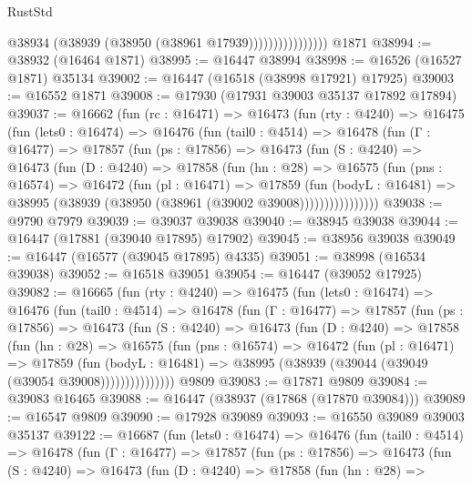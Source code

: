 \begin{lexlean}{RustStd}
\begin{coremodule}
{\begin{coremodule}
{{{{{{{{{{{{{{{{{{{{{{{{{{{{{{{{{{{{{{{{{{{{{{{{{{{{{{{                            @38934 (@38939 (@38950 (@38961 @17939))))))))))))))))
    @1871
@38994 := @38932 (@16464 @1871)
@38995 := @16447 @38994
@38998 := @16526 (@16527 @1871) @35134
@39002 := @16447 (@16518 (@38998 @17921) @17925)
@39003 := @16552 @1871
@39008 := @17930 (@17931 @39003 @35137 @17892 @17894)
@39037 := @16662
    (fun (rc : @16471) =>
    @16473
      (fun (rty : @4240) =>
      @16475
        (fun (lets0 : @16474) =>
        @16476
          (fun (tail0 : @4514) =>
          @16478
            (fun (Γ : @16477) =>
            @17857
              (fun (ps : @17856) =>
              @16473
                (fun (S : @4240) =>
                @16473
                  (fun (D : @4240) =>
                  @17858
                    (fun (hn : @28) =>
                    @16575
                      (fun (pns : @16574) =>
                      @16472
                        (fun (pl : @16471) =>
                        @17859
                          (fun (bodyL : @16481) =>
                          @38995 (@38939 (@38950 (@38961 (@39002 @39008))))))))))))))))
@39038 := @9790 @7979
@39039 := @39037 @39038
@39040 := @38945 @39038
@39044 := @16447 (@17881 (@39040 @17895) @17902)
@39045 := @38956 @39038
@39049 := @16447 (@16577 (@39045 @17895) @4335)
@39051 := @38998 (@16534 @39038)
@39052 := @16518 @39051
@39054 := @16447 (@39052 @17925)
@39082 := @16665
    (fun (rty : @4240) =>
    @16475
      (fun (lets0 : @16474) =>
      @16476
        (fun (tail0 : @4514) =>
        @16478
          (fun (Γ : @16477) =>
          @17857
            (fun (ps : @17856) =>
            @16473
              (fun (S : @4240) =>
              @16473
                (fun (D : @4240) =>
                @17858
                  (fun (hn : @28) =>
                  @16575
                    (fun (pns : @16574) =>
                    @16472
                      (fun (pl : @16471) =>
                      @17859
                        (fun (bodyL : @16481) =>
                        @38995 (@38939 (@39044 (@39049 (@39054 @39008)))))))))))))))
    @9809
@39083 := @17871 @9809
@39084 := @39083 @16465
@39088 := @16447 (@38937 (@17868 (@17870 @39084)))
@39089 := @16547 @9809
@39090 := @17928 @39089
@39093 := @16550 @39089 @39003 @35137
@39122 := @16687
    (fun (lets0 : @16474) =>
    @16476
      (fun (tail0 : @4514) =>
      @16478
        (fun (Γ : @16477) =>
        @17857
          (fun (ps : @17856) =>
          @16473
            (fun (S : @4240) =>
            @16473
              (fun (D : @4240) =>
              @17858
                (fun (hn : @28) =>
}}}}}}}}}}}}}}}}}}}}}}}}}}}}}}}}}}}}}}}}}}}}}}}}}}}}}}}
\end{coremodule}}
\end{coremodule}
\end{lexlean}

